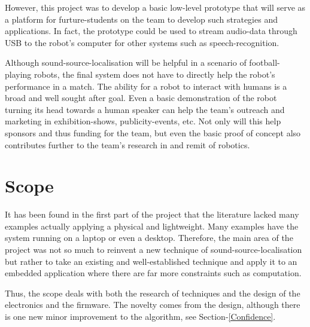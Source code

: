 \documentclass[notitlepage]{report}
\begin{document}
However, this project was to develop a basic low-level prototype that will serve as a platform for furture-students on the team to develop such strategies and applications. In fact, the prototype could be used to stream audio-data through USB to the robot's computer for other systems such as speech-recognition.

Although sound-source-localisation will be helpful in a scenario of football-playing robots, the final system does not have to directly help the robot's performance in a match. The ability for a robot to interact with humans is a broad and well sought after goal. Even a basic demonstration of the robot turning its head towards a human speaker can help the team's outreach and marketing in exhibition-shows, publicity-events, etc. Not only will this help sponsors and thus funding for the team, but even the basic proof of concept also contributes further to the team's research in and remit of robotics.

\section{Scope}

It has been found in the first part of the project that the literature lacked many examples actually applying a physical and lightweight. Many examples have the system running on a laptop or even a desktop. Therefore, the main area of the project was not so much to reinvent a new technique of sound-source-localisation but rather to take an existing and well-established technique and apply it to an embedded application where there are far more constraints such as computation.

Thus, the scope deals with both the research of techniques and the design of the electronics and the firmware. The novelty comes from the design, although there is one new minor improvement to the algorithm, see Section-\ref{Confidence}.
\end{document}
